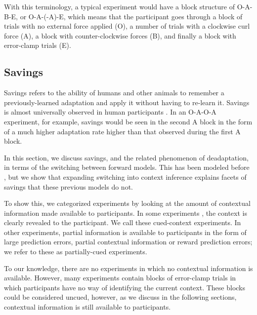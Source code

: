 \documentclass[a4paper,doc,floatsintext,natbib]{apa6}
\begin{document}
With this terminology, a typical experiment \cite[e.g.][]{Ethier_Spontaneous_2008} would have a block structure of O-A-B-E, or O-A-(-A)-E, which means that the participant goes through a block of trials with no external force applied (O), a number of trials with a clockwise curl force (A), a block with counter-clockwise forces (B), and finally a block with error-clamp trials (E).

\subsection{Savings}
Savings refers to the ability of humans and other animals to remember a previously-learned adaptation and apply it without having to re-learn it. Savings is almost universally observed in human participants \cite{Brashers-Krug_Consolidation_1996,Shadmehr_Functional_1997,Medina_Mechanism_2001,Smith_Interacting_2006,Zarahn_Explaining_2008}. In an O-A-O-A experiment, for example, savings would be seen in the second A block in the form of a much higher adaptation rate higher than that observed during the first A block.

In this section, we discuss savings, and the related phenomenon of deadaptation, in terms of the switching between forward models. This has been modeled before \citep[e.g.][]{Wolpert_Multiple_1998,Oh_Minimizing_2019}, but we show that expanding switching into context inference explains facets of savings that these previous models do not.

To show this, we categorized experiments by looking at the amount of contextual information made available to participants. In some experiments \citep[e.g.][]{Kim_Neural_2015,Lee_Dual_2009}, the context is clearly revealed to the participant. We call these cued-context experiments. In other experiments, partial information is available to participants \citep[e.g.][]{Davidson_Scaling_2004,Zarahn_Explaining_2008} in the form of large prediction errors, partial contextual information or reward prediction errors; we refer to these as partially-cued experiments.

To our knowledge, there are no experiments in which no contextual information is available. However, many experiments \citep[e.g.][]{Huang_Persistence_2009,Brennan_Decay_2015,Smith_Interacting_2006} contain blocks of error-clamp trials in which participants have no way of identifying the current context. These blocks could be considered uncued, however, as we discuss in the following sections, contextual information is still available to participants.
\end{document}

